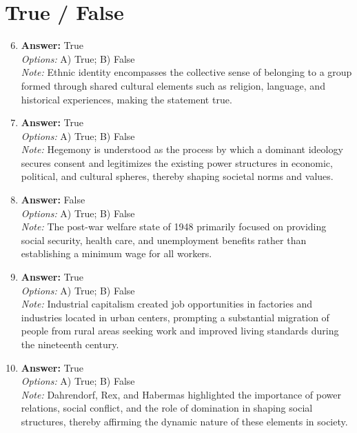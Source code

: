 \documentclass[12pt]{article}
\begin{document}
\section*{True / False}
\begin{enumerate}[label=\arabic*.]
\setcounter{enumi}{5}
\item \textbf{Answer:} True
\\ \textit{Options:} A) True; B) False
\\ \textit{Note:} Ethnic identity encompasses the collective sense of belonging to a group formed through shared cultural elements such as religion, language, and historical experiences, making the statement true.
\item \textbf{Answer:} True
\\ \textit{Options:} A) True; B) False
\\ \textit{Note:} Hegemony is understood as the process by which a dominant ideology secures consent and legitimizes the existing power structures in economic, political, and cultural spheres, thereby shaping societal norms and values.
\item \textbf{Answer:} False
\\ \textit{Options:} A) True; B) False
\\ \textit{Note:} The post-war welfare state of 1948 primarily focused on providing social security, health care, and unemployment benefits rather than establishing a minimum wage for all workers.
\item \textbf{Answer:} True
\\ \textit{Options:} A) True; B) False
\\ \textit{Note:} Industrial capitalism created job opportunities in factories and industries located in urban centers, prompting a substantial migration of people from rural areas seeking work and improved living standards during the nineteenth century.
\item \textbf{Answer:} True
\\ \textit{Options:} A) True; B) False
\\ \textit{Note:} Dahrendorf, Rex, and Habermas highlighted the importance of power relations, social conflict, and the role of domination in shaping social structures, thereby affirming the dynamic nature of these elements in society.
\end{enumerate}
\end{document}
